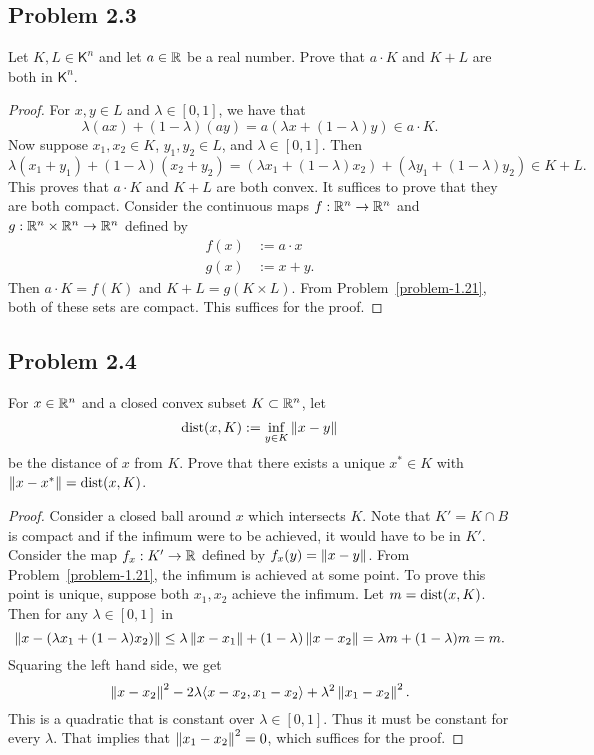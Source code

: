 \documentclass[12pt]{article}
\begin{document}
\newpage 

\subsection{Problem 2.3}

\begin{problem}
	Let $K, L \in \mathsf{K}^n$ and let $a \in \mathbb{R}$ be a real number. Prove that $a \cdot K$ and $K + L$ are both in $\mathsf{K}^n$.
\end{problem}

\begin{proof}
	For $x, y \in L$ and $\lambda \in [0, 1]$, we have that 
	\[
		\lambda (ax) + (1 - \lambda) (ay) = a(\lambda x + (1-\lambda) y) \in a \cdot K. 
	\]
	Now suppose $x_1, x_2 \in K$, $y_1, y_2 \in L$, and $\lambda \in [0, 1]$. Then 
	\[
		\lambda(x_1 + y_1) + (1-\lambda) (x_2 + y_2) = (\lambda x_1 + (1 - \lambda) x_2) + (\lambda y_1 + (1 - \lambda) y_2) \in K + L. 
	\]
	This proves that $a \cdot K$ and $K + L$ are both convex. It suffices to prove that they are both compact. Consider the continuous maps $f : \mathbb{R}^n \to \mathbb{R}^n$ and $g : \mathbb{R}^n \times \mathbb{R}^n \to \mathbb{R}^n$ defined by 
	\begin{align*}
		f(x) & := a \cdot x \\
		g(x) & := x + y.
	\end{align*}
	Then $a \cdot K = f(K)$ and $K + L = g(K \times L)$. From Problem~\ref{problem-1.21}, both of these sets are compact. This suffices for the proof. 
\end{proof}

\newpage 

\subsection{Problem 2.4}

\begin{problem}
	For $x \in \mathbb{R}^n$ and a closed convex subset $K \subset \mathbb{R}^n$, let 
    \[
        \operatorname{dist}(x, K) := \inf_{y \in K} \left\lVert x-y\right\rVert
    \]
    be the distance of $x$ from $K$. Prove that there exists a unique $x^* \in K$ with $\left\lVert x-x^*\right\rVert = \operatorname{dist}(x, K)$.
\end{problem}

\begin{proof}
	Consider a closed ball around $x$ which intersects $K$. Note that $K' = K \cap B$ is compact and if the infimum were to be achieved, it would have to be in $K'$. Consider the map $f_x : K' \to \mathbb{R}$ defined by $f_x(y) = \left\lVert x-y\right\rVert$. From Problem~\ref{problem-1.21}, the infimum is achieved at some point. To prove this point is unique, suppose both $x_1, x_2$ achieve the infimum. Let $m = \operatorname{dist}(x, K)$. Then for any $\lambda \in [0, 1]$ in 
	\[
		\left\lVert x - (\lambda x_1 + (1 - \lambda)x_2)\right\rVert \leq \lambda \left\lVert x - x_1\right\rVert + (1 - \lambda) \left\lVert x - x_2\right\rVert = \lambda m + (1 - \lambda) m = m. 
	\]
	Squaring the left hand side, we get 
	\[
		\left\lVert x - x_2\right\rVert^2 - 2\lambda \langle x-x_2, x_1 - x_2 \rangle + \lambda^2 \left\lVert x_1 - x_2\right\rVert^2.
	\]
	This is a quadratic that is constant over $\lambda \in [0, 1]$. Thus it must be constant for every $\lambda$. That implies that $\left\lVert x_1 - x_2\right\rVert^2 = 0$, which suffices for the proof. 
\end{proof}
\end{document}
